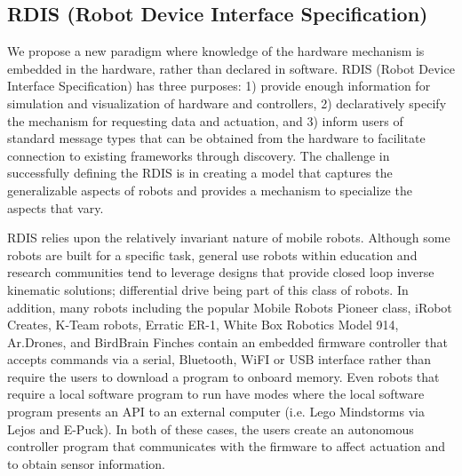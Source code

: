 \subsection{RDIS (Robot Device Interface Specification)}
We propose a new paradigm where knowledge of the hardware mechanism is embedded in the hardware, rather than declared in software.  RDIS (Robot Device Interface Specification) has three purposes: 1) provide enough information for simulation and visualization of hardware and controllers, 2) declaratively specify the mechanism for requesting data and actuation, and 3) inform users of standard message types that can be obtained from the hardware to facilitate connection to existing frameworks through discovery.  The challenge in successfully defining the RDIS is in creating a model that captures the generalizable aspects of robots and provides a mechanism to specialize the aspects that vary.

RDIS relies upon the relatively invariant nature of mobile robots.  Although some robots are built for a specific task, general use robots within education and research communities tend to leverage designs that provide closed loop inverse kinematic solutions; differential drive being part of this class of robots.  In addition, many robots including the popular Mobile Robots Pioneer class, iRobot Creates, K-Team robots, Erratic ER-1, White Box Robotics Model 914, Ar.Drones, and BirdBrain Finches
contain an embedded firmware controller that accepts commands via a serial, Bluetooth, WiFI or USB interface rather than require the users to download a program to onboard memory.  Even robots that require a local software program to run have modes where the local software program presents an API to an external computer (i.e. Lego Mindstorms via Lejos and E-Puck).  In both of these cases, the users create an autonomous controller program that communicates with the firmware to affect actuation and to obtain sensor information.  


